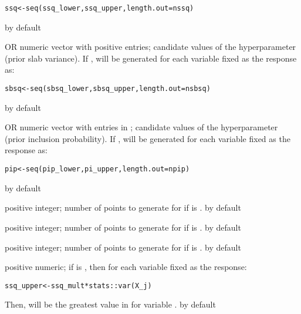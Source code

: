 \documentclass[a4paper]{book}
\begin{document}
\begin{Arguments}
\begin{ldescription}
\begin{alltt}ssq <- seq(ssq_lower, ssq_upper, length.out = nssq)
\end{alltt}


 by default

\item[\code{sbsq}]  OR numeric vector with positive entries; candidate values
of the hyperparameter  (prior slab
variance). If ,  will be generated for each variable
 fixed as the response as:

\begin{alltt}sbsq <- seq(sbsq_lower, sbsq_upper, length.out = nsbsq)
\end{alltt}


 by default

\item[\code{pip}]  OR numeric vector with entries in ; candidate
values of the hyperparameter \eqn{\pi}{} (prior inclusion probability). If
,  will be generated for each variable  fixed as the
response as:

\begin{alltt}pip <- seq(pip_lower, pi_upper, length.out = npip)
\end{alltt}


 by default

\item[\code{nssq}] positive integer; number of points to generate for  if
 is .  by default

\item[\code{nsbsq}] positive integer; number of points to generate for  if
 is .  by default

\item[\code{npip}] positive integer; number of points to generate for  if 
is .  by default

\item[\code{ssq\_mult}] positive numeric; if  is , then for each variable
 fixed as the response:

\begin{alltt}ssq_upper <- ssq_mult * stats::var(X_j)
\end{alltt}


Then,  will be the greatest value in  for variable
.  by default


\end{ldescription}
\end{Arguments}
\end{document}
